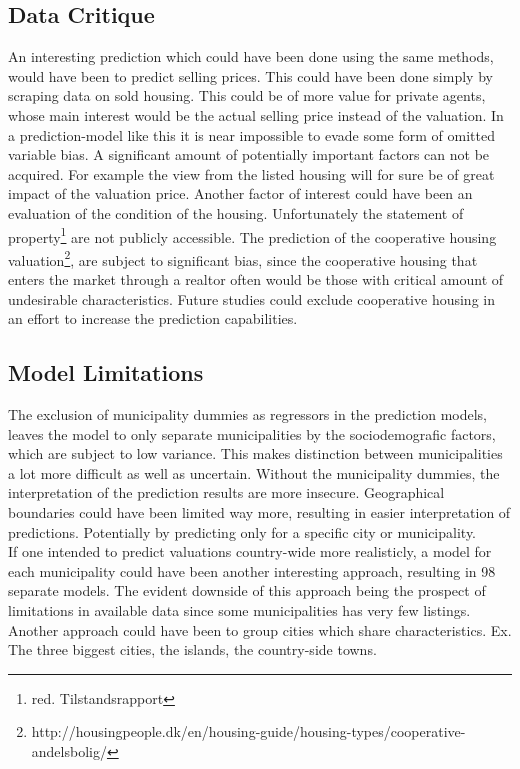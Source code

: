 \documentclass[12pt,a4paper]{article}
\begin{document}
\subsection{Data Critique}
An interesting prediction which could have been done using the same methods, would have been to predict selling prices. This could have been done simply by scraping data on sold housing. This could be of more value for private agents, whose main interest would be the actual selling price instead of the valuation. \newline 
In a prediction-model like this it is near impossible to evade some form of omitted variable bias. A significant amount of potentially important factors can not be acquired. For example the view from the listed housing will for sure be of great impact of the valuation price. Another factor of interest could have been an evaluation of the condition of the housing. Unfortunately the statement of property\footnote{red. Tilstandsrapport} are not publicly accessible. \newline
The prediction of the cooperative housing valuation\footnote{http://housingpeople.dk/en/housing-guide/housing-types/cooperative-andelsbolig/},
are subject to significant bias, since the cooperative housing that enters the market through a realtor often would be those with critical amount of undesirable characteristics. Future studies could exclude cooperative housing in an effort to increase the prediction capabilities.  

\subsection{Model Limitations}
The exclusion of municipality dummies as regressors in the prediction models, leaves the model to only separate municipalities by the sociodemografic factors, which are subject to low variance. This makes distinction between municipalities a lot more difficult as well as uncertain.   
Without the municipality dummies, the interpretation of the prediction results are more insecure. %
Geographical boundaries could have been limited way more, resulting in easier interpretation of predictions. Potentially by predicting only for a specific city or municipality. \\
If one intended to predict valuations country-wide more realisticly, a model for each municipality could have been another interesting approach, resulting in 98 separate models. The evident downside of this approach being the prospect of limitations in available data since some municipalities has very few listings.     
Another approach could have been to group cities which share characteristics. Ex. The three biggest cities, the islands, the country-side towns.    
\end{document}
